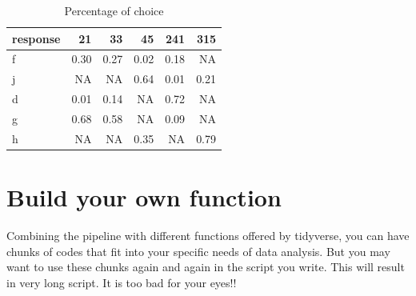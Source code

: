 \documentclass[]{book}
\newenvironment{Shaded}{\begin{snugshade}}{\end{snugshade}}
\newcommand{\KeywordTok}[1]{\textcolor[rgb]{0.13,0.29,0.53}{\textbf{#1}}}
\newcommand{\DataTypeTok}[1]{\textcolor[rgb]{0.13,0.29,0.53}{#1}}
\newcommand{\DecValTok}[1]{\textcolor[rgb]{0.00,0.00,0.81}{#1}}
\newcommand{\StringTok}[1]{\textcolor[rgb]{0.31,0.60,0.02}{#1}}
\newcommand{\OperatorTok}[1]{\textcolor[rgb]{0.81,0.36,0.00}{\textbf{#1}}}
\newcommand{\NormalTok}[1]{#1}
\begin{document}
\begin{Shaded}
\end{Shaded}

\begin{table}[t]

\caption{\label{tab:unnamed-chunk-24}Percentage of choice}
\centering
\begin{tabular}{l|r|r|r|r|r}
\hline
response & 21 & 33 & 45 & 241 & 315\\
\hline
f & 0.30 & 0.27 & 0.02 & 0.18 & NA\\
\hline
j & NA & NA & 0.64 & 0.01 & 0.21\\
\hline
d & 0.01 & 0.14 & NA & 0.72 & NA\\
\hline
g & 0.68 & 0.58 & NA & 0.09 & NA\\
\hline
h & NA & NA & 0.35 & NA & 0.79\\
\hline
\end{tabular}
\end{table}

\chapter{Build your own function}\label{build-your-own-function}

Combining the pipeline with different functions offered by tidyverse,
you can have chunks of codes that fit into your specific needs of data
analysis. But you may want to use these chunks again and again in the
script you write. This will result in very long script. It is too bad
for your eyes!!
\end{document}
